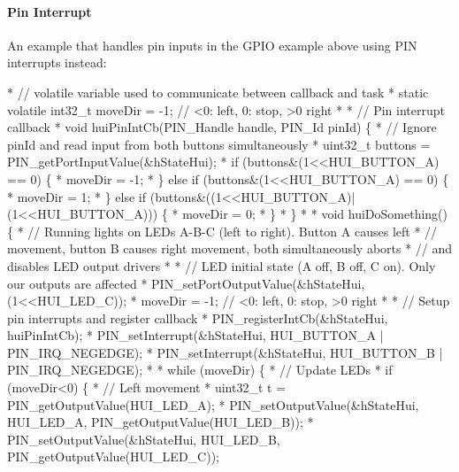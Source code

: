 \paragraph*{Pin Interrupt}

An example that handles pin inputs in the G\-P\-I\-O example above using P\-I\-N interrupts instead\-: 
\begin{DoxyCode}
*    \textcolor{comment}{// volatile variable used to communicate between callback and task}
*    \textcolor{keyword}{static} \textcolor{keyword}{volatile} int32\_t moveDir = -1;    \textcolor{comment}{// <0: left, 0: stop, >0 right}
*
*    \textcolor{comment}{// Pin interrupt callback}
*    \textcolor{keywordtype}{void} huiPinIntCb(PIN_Handle handle, PIN_Id pinId) \{
*        \textcolor{comment}{// Ignore pinId and read input from both buttons simultaneously}
*        uint32\_t buttons = PIN_getPortInputValue(&hStateHui);
*        \textcolor{keywordflow}{if} (buttons&(1<<HUI\_BUTTON\_A) == 0) \{
*            moveDir = -1;
*        \} \textcolor{keywordflow}{else} \textcolor{keywordflow}{if} (buttons&(1<<HUI\_BUTTON\_A) == 0) \{
*             moveDir = 1;
*        \} \textcolor{keywordflow}{else} \textcolor{keywordflow}{if} (buttons&((1<<HUI\_BUTTON\_A)|(1<<HUI\_BUTTON\_A))) \{
*            moveDir = 0;
*        \}
*    \}
*
*    \textcolor{keywordtype}{void} huiDoSomething() \{
*        \textcolor{comment}{// Running lights on LEDs A-B-C (left to right). Button A causes left}
*        \textcolor{comment}{// movement, button B causes right movement, both simultaneously aborts}
*        \textcolor{comment}{// and disables LED output drivers}
*
*        \textcolor{comment}{// LED initial state (A off, B off, C on). Only our outputs are affected}
*        PIN_setPortOutputValue(&hStateHui, (1<<HUI\_LED\_C));
*        moveDir = -1;    \textcolor{comment}{// <0: left, 0: stop, >0 right}
*
*        \textcolor{comment}{// Setup pin interrupts and register callback}
*        PIN_registerIntCb(&hStateHui, huiPinIntCb);
*        PIN_setInterrupt(&hStateHui, HUI\_BUTTON\_A | PIN_IRQ_NEGEDGE);
*        PIN_setInterrupt(&hStateHui, HUI\_BUTTON\_B | PIN_IRQ_NEGEDGE);
*
*        \textcolor{keywordflow}{while} (moveDir) \{
*            \textcolor{comment}{// Update LEDs}
*            \textcolor{keywordflow}{if} (moveDir<0) \{
*                \textcolor{comment}{// Left movement}
*                uint32\_t t = PIN_getOutputValue(HUI\_LED\_A);
*                PIN_setOutputValue(&hStateHui, HUI\_LED\_A, PIN_getOutputValue(HUI\_LED\_B));
*                PIN_setOutputValue(&hStateHui, HUI\_LED\_B, PIN_getOutputValue(HUI\_LED\_C));

\end{DoxyCode}
